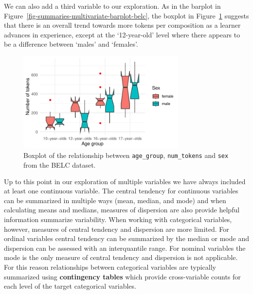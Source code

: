 \documentclass[
  letterpaper,
]{latex/krantz}
\begin{document}
We can also add a third variable to our exploration. As in the barplot
in Figure~\ref{fig-summaries-multivariate-barplot-belc}, the boxplot in
Figure~\ref{fig-summaries-multivariate-boxplots-belc} suggests that
there is an overall trend towards more tokens per composition as a
learner advances in experience, except at the `12-year-old' level where
there appears to be a difference between `males' and `females'.

\begin{figure}[h]

{\centering \includegraphics[width=0.75\textwidth,height=\textheight]{approaching-analysis_files/figure-pdf/fig-summaries-multivariate-boxplots-belc-1.pdf}

}

\caption{\label{fig-summaries-multivariate-boxplots-belc}Boxplot of the
relationship between \texttt{age\_group}, \texttt{num\_tokens} and
\texttt{sex} from the BELC dataset.}

\end{figure}

Up to this point in our exploration of multiple variables we have always
included at least one continuous variable. The central tendency for
continuous variables can be summarized in multiple ways (mean, median,
and mode) and when calculating means and medians, measures of dispersion
are also provide helpful information summarize variability. When working
with categorical variables, however, measures of central tendency and
dispersion are more limited. For ordinal variables central tendency can
be summarized by the median or mode and dispersion can be assessed with
an interquantile range. For nominal variables the mode is the only
measure of central tendency and dispersion is not applicable. For this
reason relationships between categorical variables are typically
summarized using \textbf{contingency tables} which provide
cross-variable counts for each level of the target categorical
variables.
\end{document}
